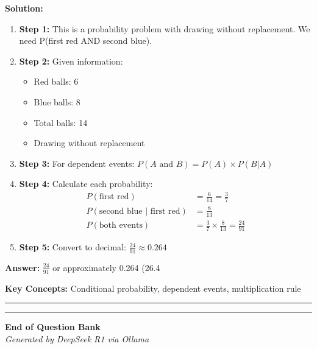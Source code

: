 \documentclass[12pt]{article}
\begin{document}
\textbf{Solution:}
\begin{enumerate}
\item \textbf{Step 1:} This is a probability problem with drawing without replacement. We need P(first red AND second blue).

\item \textbf{Step 2:} Given information:
\begin{itemize}
\item Red balls: 6
\item Blue balls: 8
\item Total balls: 14
\item Drawing without replacement
\end{itemize}

\item \textbf{Step 3:} For dependent events: $P(A \text{ and } B) = P(A) \times P(B|A)$

\item \textbf{Step 4:} Calculate each probability:
\begin{align}
P(\text{first red}) &= \frac{6}{14} = \frac{3}{7} \\
P(\text{second blue | first red}) &= \frac{8}{13} \\
P(\text{both events}) &= \frac{3}{7} \times \frac{8}{13} = \frac{24}{91}
\end{align}

\item \textbf{Step 5:} Convert to decimal: $\frac{24}{91} \approx 0.264$
\end{enumerate}

\textbf{Answer:} $\frac{24}{91}$ or approximately 0.264 (26.4%

\textbf{Key Concepts:} Conditional probability, dependent events, multiplication rule

\hrule
\vspace{1em}

\newpage


\vspace{2em}
\hrule
\vspace{1em}
\begin{center}
\textbf{End of Question Bank}\\
\textit{Generated by DeepSeek R1 via Ollama}
\end{center}
\end{document}
